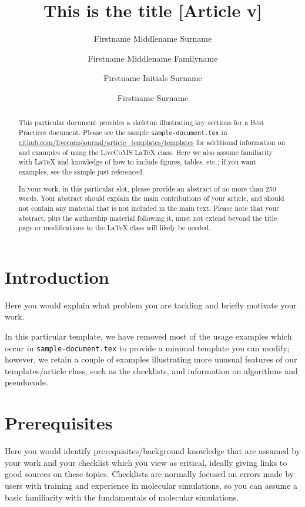 \documentclass[9pt,bestpractices]{livecoms}
\title{This is the title [Article v\versionnumber]}
\author[1*]{Firstname Middlename Surname}
\author[1,2\authfn{1}\authfn{3}]{Firstname Middlename Familyname}
\author[2\authfn{1}\authfn{4}]{Firstname Initials Surname}
\author[2*]{Firstname Surname}
\affil[1]{Institution 1}
\affil[2]{Institution 2}
\begin{document}
\begin{frontmatter}
\maketitle

\begin{abstract}
This particular document provides a skeleton illustrating key sections for a Best Practices document. Please see the sample \texttt{sample-document.tex} in \url{github.com/livecomsjournal/article_templates/templates} for additional information on and examples of using the LiveCoMS LaTeX class.
Here we also assume familiarity with LaTeX and knowledge of how to include figures, tables, etc.; if you want examples, see the sample just referenced.

In your work, in this particular slot, please provide an abstract of no more than 250 words.
Your abstract should explain the main contributions of your article, and should not contain any material that is not included in the main text.
Please note that your abstract, plus the authorship material following it, must not extend beyond the title page or modifications to the LaTeX class will likely be needed.
\end{abstract}

\end{frontmatter}




\section{Introduction}

Here you would explain what problem you are tackling and briefly motivate your work.

In this particular template, we have removed most of the usage examples which occur in \texttt{sample-document.tex} to provide a minimal template you can modify; however, we retain a couple of examples illustrating more unusual features of our templates/article class, such as the checklists, and information on algorithms and pseudocode.

\section{Prerequisites}

Here you would identify prerequisites/background knowledge that are assumed by your work and your checklist which you view as critical, ideally giving links to good sources on these topics.
Checklists are normally focused on errors made by users with training and experience in molecular simulations, so you can assume a basic familiarity with the fundamentals of molecular simulations.
\end{document}
